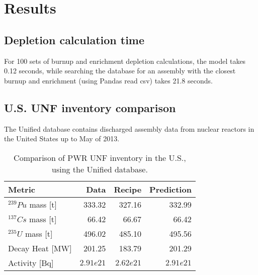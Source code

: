 \section{Results}


\subsection{Depletion calculation time}

For 100 sets of
burnup and enrichment depletion calculations,
the model takes 0.12 seconds, while
searching the database for an assembly
with the closest burnup and enrichment (using Pandas read csv)
takes 21.8 seconds.

\subsection{U.S. \gls{UNF} inventory comparison}


The Unified database contains discharged assembly data
from nuclear reactors in the United States up to May of
2013. 


\begin{table}[h]
    \centering
    \begin{tabular}{lrrr}
        \hline
        Metric & Data & Recipe & Prediction \\
        \hline
        $^{239}Pu$ mass [t] & 333.32 & 327.16 & 332.99\\
        $^{137}Cs$ mass [t] & 66.42 & 66.67 & 66.42\\
        $^{235}U$ mass [t] & 496.02 & 485.10 & 495.56\\
        Decay Heat [MW] & 201.25 & 183.79 & 201.29 \\
        Activity [Bq] & $2.91e21$ & $2.62e21$ & $2.91e21$ \\
        \hline
    \end{tabular}
    \caption{Comparison of \gls{PWR} \gls{UNF} inventory in the U.S.,
             using the Unified database.}
\end{table}


